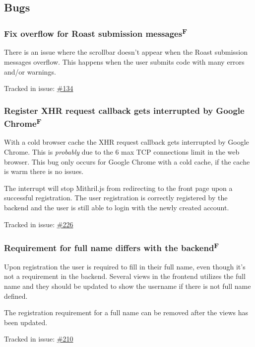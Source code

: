 \documentclass[12pt,a4paper]{report}
\begin{document}
\subsection*{Bugs}
\subsubsection{Fix overflow for Roast submission messages\texorpdfstring{\textsuperscript{F}}{}}
There is an issue where the scrollbar doesn't appear when the Roast submission messages overflow. This happens when the user submits code with many errors and/or warnings.

Tracked in issue: \href{https://github.com/LuleaUniversityOfTechnology/2018-project-roaster/issues/134}{\#134}

\subsubsection{Register XHR request callback gets interrupted by Google  Chrome\texorpdfstring{\textsuperscript{F}}{}}
With a cold browser cache the XHR request callback gets interrupted by Google Chrome. This is \textit{probably} due to the 6 max TCP connections limit in the web browser. This bug only occurs for Google Chrome with a cold cache, if the cache is warm there is no issues.

The interrupt will stop Mithril.js from redirecting to the front page upon a successful registration. The user registration is correctly registered by the backend and the user is still able to login with the newly created account.

Tracked in issue: \href{https://github.com/LuleaUniversityOfTechnology/2018-project-roaster/issues/226}{\#226}

\subsubsection{Requirement for full name differs with the backend\texorpdfstring{\textsuperscript{F}}{}}
Upon registration the user is required to fill in their full name, even though it's not a requirement in the backend. Several views in the frontend utilizes the full name and they should be updated to show the username if there is not full name defined.

The registration requirement for a full name can be removed after the views has been updated.

Tracked in issue: \href{https://github.com/LuleaUniversityOfTechnology/2018-project-roaster/issues/210}{\#210}
\end{document}
